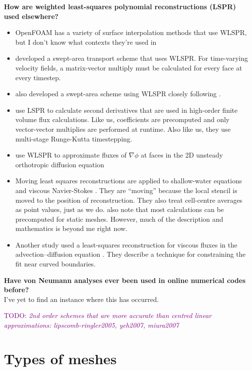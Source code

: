 \documentclass[times]{elsarticle}
\newcommand{\TODO}[1]{\textcolor{purple}{TODO: \emph{#1}}}
\begin{document}
\textbf{How are weighted least-squares polynomial reconstructions (LSPR) used elsewhere?}
\begin{itemize}
	\item OpenFOAM has a variety of surface interpolation methods that use WLSPR, but I don't know what contexts they're used in
	\item \citep{lashley2002} developed a swept-area transport scheme that uses WLSPR.  For time-varying velocity fields, a matrix-vector multiply must be calculated for every face at every timestep.
	\item \citep{skamarock-menchaca2010} also developed a swept-area scheme using WLSPR closely following \citep{lashley2002}.
	\item \citep{skamarock-gassmann2011} use LSPR to calculate second derivatives that are used in high-order finite volume flux calculations.  Like us, coefficients are precomputed and only vector-vector multiplies are performed at runtime.  Also like us, they use multi-stage Runge-Kutta timestepping.
	\item \citep{jayantha-turner2003} use WLSPR to approximate fluxes of $\nabla \phi$ at faces in the 2D unsteady orthotropic diffusion equation
	\item Moving least squares reconstructions are applied to shallow-water equations \citep{cuetofelgueroso2006} and viscous Navier-Stokes \citep{cuetofelgueroso2007}.  They are ``moving'' because the local stencil is moved to the position of reconstruction.  They also treat cell-centre averages as point values, just as we do.
	\citep{cuetofelgueroso2007} also note that most calculations can be precomputed for static meshes.
	However, much of the description and mathematics is beyond me right now.  
	\item Another study used a least-squares reconstruction for viscous fluxes in the advection--diffusion equation \citep{olliviergooch-vanaltena2002}.  They describe a technique for constraining the fit near curved boundaries.
\end{itemize}

\textbf{Have von Neumann analyses ever been used in online numerical codes before?} \\
I've yet to find an instance where this has occurred.


\TODO{2nd order schemes that are more accurate than centred linear approximations: lipscomb-ringler2005, yeh2007, miura2007}

\section{Types of meshes}
\end{document}
